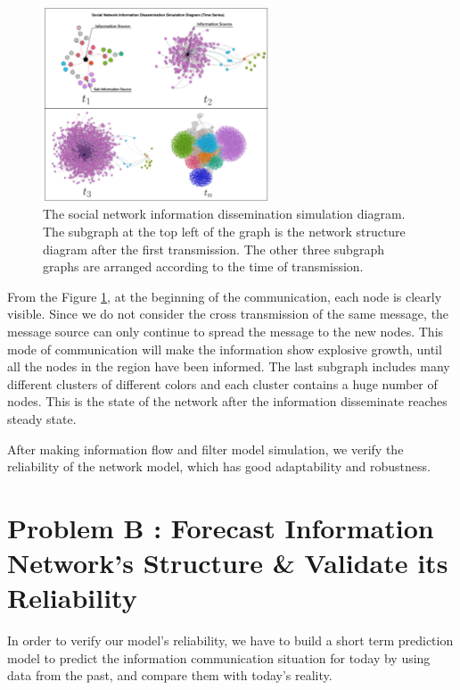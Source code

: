 \documentclass[a4paper,11pt]{article}
\begin{document}
\begin{figure}[h]%
    \centering 
    \includegraphics[width=0.6\textwidth]{./Pic/Social_Network_Information_Dissemination_Simulation_Diagram.png}
    \caption{The social network information dissemination simulation diagram. The subgraph at the top left of the graph is the network structure diagram after the first transmission. The other three subgraph graphs are arranged according to the time of transmission.}
    \label{fig:Social_Network_Information_Dissemination_Simulation_Diagram}  
\end{figure}

\par From the Figure \ref{fig:Social_Network_Information_Dissemination_Simulation_Diagram}, at the beginning of the communication, each node is clearly visible. Since we do not consider the cross transmission of the same message, the message source can only continue to spread the message to the new nodes. This mode of communication will make the information show explosive growth, until all the nodes in the region have been informed. The last subgraph includes many different clusters of different colors and each cluster contains a huge number of nodes. This is the state of the network after the information disseminate reaches steady state.

\par After making information flow and filter model simulation, we verify the reliability of the network model, which has good adaptability and robustness.



\section{Problem B : Forecast Information Network's Structure \& Validate its Reliability}
\par In order to verify our model's reliability, we have to build a short term prediction model to predict the information communication situation for today by using data from the past, and compare them with today's reality.
\end{document}
